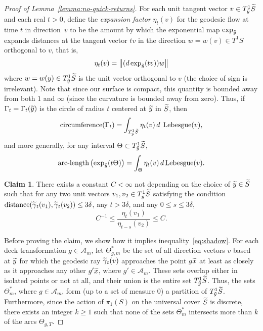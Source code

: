 \documentclass[10pt]{amsart}
\theoremstyle{definition}\newtheorem{defi}[theo]{Definition}\newtheorem{rema}[theo]{Remark}\newtheorem{exam}[theo]{Example}\newtheorem{exem}[theo]{Example}\newtheorem{nota}[theo]{Notation}
\newtheorem{claim}{Claim}}
\DeclareMathOperator{\Lebesgue}{Lebesgue}
\DeclareMathOperator{\distance}{distance}
\let\oldtilde\tilde
\renewcommand*{\tilde}[1]{\mathchoice{\widetilde{#1}}{\widetilde{#1}}{\oldtilde{#1}}{\oldtilde{#1}}}\let\oldforall\forall
\renewcommand*{\forall}{\mathrel{\oldforall}}
\begin{document}
\begin{proof}[Proof of Lemma~\ref{lemma:no-quick-returns}]
For each unit tangent vector $v \in T^{1}_{\tilde{y}}\tilde{S}$ and each real $t>0$, define the \emph{expansion factor} $\eta_{t}(v)$ for the geodesic flow at time $t$ in direction~$v$ to be the amount by which the exponential map $\exp _{\tilde{y}}$ expands distances at the tangent vector $tv$ in the direction $w=w(v)\in T^{1}S$ orthogonal to $v$, that is,
\[
\eta_{t}(v)= \left\|(d\exp_{\tilde{y}}(t v))w\right\|
\]
where $w=w(y)\in T^{1}_{\tilde{y}}\tilde{S}$ is the unit vector orthogonal to $v$ (the choice of sign is irrelevant). Note that since our surface is compact, this quantity is bounded away from both $1$ and $\infty$ (since the curvature is bounded away from zero). Thus, if $\Gamma_{t}=\Gamma_{t}(\tilde{y})$ is the circle of radius $t$ centered at $\tilde{y}$ in $\tilde{S}$, then
\begin{equation}\label{eq:expansionFormulaC}
\textrm{circumference}(\Gamma_{t})= \int_{T^{1}_{\tilde{y}}\tilde{S}}\eta_{t}(v) \, d\;\Lebesgue(v),
\end{equation}
and more generally, for any interval $\Theta \subset T^{1}_{\tilde{y}}\tilde{S}$,
\begin{equation}\label{eq:expansionFormulaG}
\textrm{arc-length} \left(\exp_{\tilde{y}}(t \Theta)\right)=\int_{\Theta}\eta_{t}(v) \, d \Lebesgue(v).
\end{equation}

\begin{claim}\label{claim:expansionFactor}
There exists a constant $C<\infty$ not depending on the choice of $\tilde{y}\in \tilde{S}$ such that for any two unit vectors $v_{1},v_{2}\in T^{1}_{\tilde{y}}\tilde{S}$ satisfying the condition $\distance(\tilde{\gamma}_{t}(v_{1}),\tilde{\gamma}_{t}(v_{2}))\leq 3\delta$, any $t> 3 \delta$, and any $0\leq s\leq 3\delta$,
\begin{equation}\label{eq:expansionBounds}
C^{-1}\leq \frac{\eta_{t}(v_{1})}{\eta_{t-s}(v_{2})} \leq C.
\end{equation}
\end{claim}

Before proving the claim, we show how it implies inequality~\eqref{eq:shadow}. For each deck transformation $g\in \mathcal{A}_{m}$, let $\Theta^{*}_{g,m}$ be the set of all direction vectors $v$ based at $\tilde{y}$ for which the geodesic ray $\tilde{\gamma}_{t}(v)$ approaches the point $g \tilde{x}$ at least as closely as it approaches any other $g' \tilde{x}$, where $g' \in \mathcal{A}_{m}$. These sets overlap either in isolated points or not at all, and their union is the entire set $T^{1}_{\tilde{y}}\tilde{S}$. Thus, the sets $\Theta^{*}_{m}$, where $g \in \mathcal{A}_{m}$, form (up to a set of measure $0$) a partition of $T^{1}_{\tilde{y}}\tilde{S}$. Furthermore, since the action of $\pi_{1}(S)$ on the universal cover $\tilde{S}$ is discrete, there exists an integer $k \geq1$ such that none of the sets $\Theta^{*}_{m}$ intersects more than $k$ of the arcs $\Theta_{g,T}$.


\end{proof}
\end{document}
